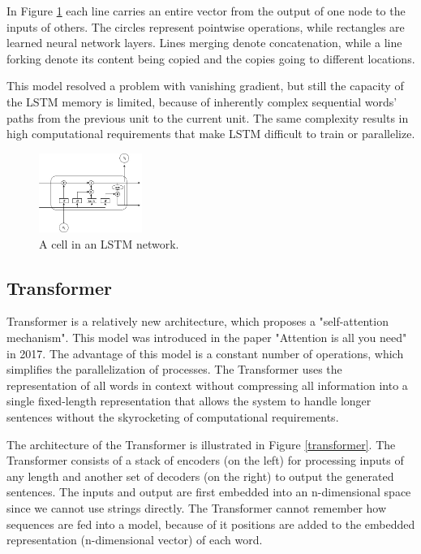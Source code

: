 In Figure \ref{lstm} each line carries an entire vector from the output of one node to the inputs of others. The circles represent pointwise operations, while rectangles are learned neural network layers. Lines merging denote concatenation, while a line forking denote its content being copied and the copies going to different locations.

This model resolved a problem with vanishing gradient, but still the capacity of the LSTM memory is limited, because of inherently complex sequential words' paths from the previous unit to the current unit. The same complexity results in high computational requirements that make LSTM difficult to train or parallelize.

\begin{figure}[hbt]
  \centering
  \includegraphics[width=0.3\textwidth]{figures/lstm.jpg}
  \caption{A cell in an LSTM network.}
  \label{lstm}
\end{figure}


\subsection{Transformer} 
Transformer is a relatively new architecture, which proposes a "self-attention mechanism". This model was introduced in the paper "Attention is all you need" \cite{transformer} in 2017. The advantage of this model is a constant number of operations, which simplifies the parallelization of processes. The Transformer uses the representation of all words in context without compressing all information into a single fixed-length representation that allows the system to handle longer sentences without the skyrocketing of computational requirements. 

The architecture of the Transformer is illustrated in Figure \ref{transformer}. The Transformer consists of a stack of encoders (on the left) for processing inputs of any length and another set of decoders (on the right) to output the generated sentences. The inputs and output are first embedded into an n-dimensional space since we cannot use strings directly. The Transformer cannot remember how sequences are fed into a model, because of it positions are added to the embedded representation (n-dimensional vector) of each word.

